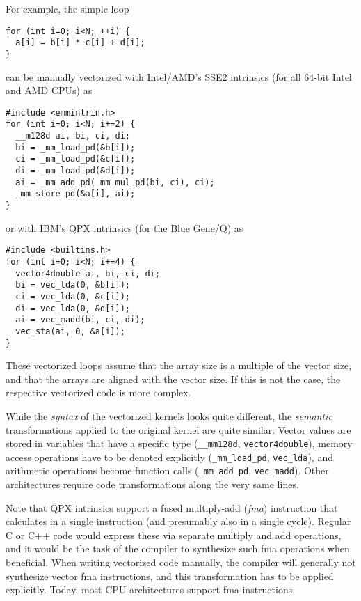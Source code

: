 \documentclass[conference]{IEEEtran}
\begin{document}
For example, the simple loop

\begin{small}
\begin{verbatim}
for (int i=0; i<N; ++i) {
  a[i] = b[i] * c[i] + d[i];
}
\end{verbatim}
\end{small}

\noindent can be manually vectorized with Intel/AMD's SSE2 intrinsics
(for all 64-bit Intel and AMD CPUs) as

\begin{small}
\begin{verbatim}
#include <emmintrin.h>
for (int i=0; i<N; i+=2) {
  __m128d ai, bi, ci, di;
  bi = _mm_load_pd(&b[i]);
  ci = _mm_load_pd(&c[i]);
  di = _mm_load_pd(&d[i]);
  ai = _mm_add_pd(_mm_mul_pd(bi, ci), ci);
  _mm_store_pd(&a[i], ai);
}
\end{verbatim}
\end{small}

\noindent or with IBM's QPX intrinsics (for the Blue Gene/Q) as

\begin{small}
\begin{verbatim}
#include <builtins.h>
for (int i=0; i<N; i+=4) {
  vector4double ai, bi, ci, di;
  bi = vec_lda(0, &b[i]);
  ci = vec_lda(0, &c[i]);
  di = vec_lda(0, &d[i]);
  ai = vec_madd(bi, ci, di);
  vec_sta(ai, 0, &a[i]);
}
\end{verbatim}
\end{small}

\noindent These vectorized loops assume that the array size  is a
multiple of the vector size, and that the arrays are aligned with the
vector size. If this is not the case, the respective vectorized code
is more complex.

While the \emph{syntax} of the vectorized kernels looks
quite different, the \emph{semantic} transformations applied to the
original kernel are quite similar. Vector values are stored in
variables that have a specific type (\verb+__mm128d+,
\verb+vector4double+), memory access operations have to be denoted
explicitly (\verb+_mm_load_pd+, \verb+vec_lda+), and arithmetic
operations become function calls (\verb+_mm_add_pd+, \verb+vec_madd+).
Other architectures require code transformations along the very same
lines.

Note that QPX intrinsics support a fused multiply-add (\emph{fma})
instruction that calculates  in a single instruction (and
presumably also in a single cycle). Regular C or C++ code would
express these via separate multiply and add operations, and it would
be the task of the compiler to synthesize such fma operations when
beneficial. When writing vectorized code manually, the compiler will
generally not synthesize vector fma instructions, and this
transformation has to be applied explicitly. Today, most CPU
architectures support fma instructions.
\end{document}
